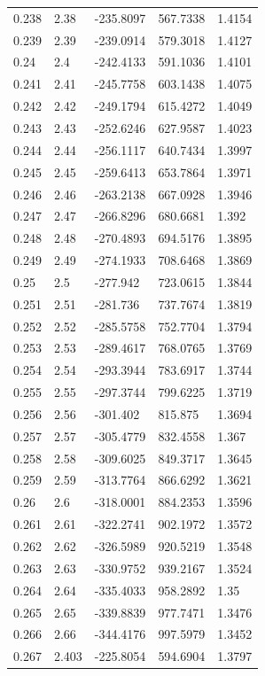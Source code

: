 \begin{tabular}{lllll}
0.238 & 2.38 & -235.8097 & 567.7338 & 1.4154 \\
0.239 & 2.39 & -239.0914 & 579.3018 & 1.4127 \\
0.24 & 2.4 & -242.4133 & 591.1036 & 1.4101 \\
0.241 & 2.41 & -245.7758 & 603.1438 & 1.4075 \\
0.242 & 2.42 & -249.1794 & 615.4272 & 1.4049 \\
0.243 & 2.43 & -252.6246 & 627.9587 & 1.4023 \\
0.244 & 2.44 & -256.1117 & 640.7434 & 1.3997 \\
0.245 & 2.45 & -259.6413 & 653.7864 & 1.3971 \\
0.246 & 2.46 & -263.2138 & 667.0928 & 1.3946 \\
0.247 & 2.47 & -266.8296 & 680.6681 & 1.392 \\
0.248 & 2.48 & -270.4893 & 694.5176 & 1.3895 \\
0.249 & 2.49 & -274.1933 & 708.6468 & 1.3869 \\
0.25 & 2.5 & -277.942 & 723.0615 & 1.3844 \\
0.251 & 2.51 & -281.736 & 737.7674 & 1.3819 \\
0.252 & 2.52 & -285.5758 & 752.7704 & 1.3794 \\
0.253 & 2.53 & -289.4617 & 768.0765 & 1.3769 \\
0.254 & 2.54 & -293.3944 & 783.6917 & 1.3744 \\
0.255 & 2.55 & -297.3744 & 799.6225 & 1.3719 \\
0.256 & 2.56 & -301.402 & 815.875 & 1.3694 \\
0.257 & 2.57 & -305.4779 & 832.4558 & 1.367 \\
0.258 & 2.58 & -309.6025 & 849.3717 & 1.3645 \\
0.259 & 2.59 & -313.7764 & 866.6292 & 1.3621 \\
0.26 & 2.6 & -318.0001 & 884.2353 & 1.3596 \\
0.261 & 2.61 & -322.2741 & 902.1972 & 1.3572 \\
0.262 & 2.62 & -326.5989 & 920.5219 & 1.3548 \\
0.263 & 2.63 & -330.9752 & 939.2167 & 1.3524 \\
0.264 & 2.64 & -335.4033 & 958.2892 & 1.35 \\
0.265 & 2.65 & -339.8839 & 977.7471 & 1.3476 \\
0.266 & 2.66 & -344.4176 & 997.5979 & 1.3452 \\
0.267 & 2.403 & -225.8054 & 594.6904 & 1.3797 \\

\end{tabular}
